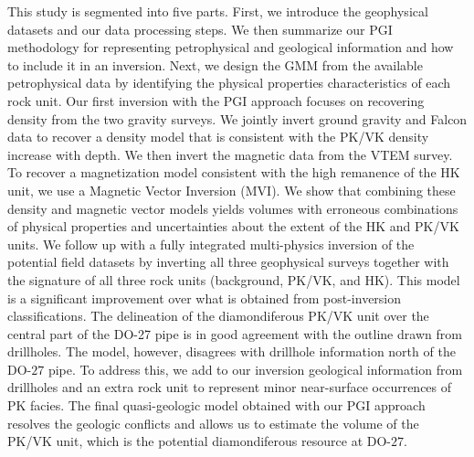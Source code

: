 \documentclass[paper, twocolumn]{geophysics} %
\begin{document}
This study is segmented into five parts. First, we introduce the geophysical datasets and our data processing steps. We then summarize our PGI methodology for representing petrophysical and geological information and how to include it in an inversion. Next, we design the GMM from the available petrophysical data by identifying the physical properties characteristics of each rock unit. Our first inversion with the PGI approach focuses on recovering density from the two gravity surveys. We jointly invert ground gravity and Falcon data to recover a density model that is consistent with the PK/VK density increase with depth. We then invert the magnetic data from the VTEM survey. To recover a magnetization model consistent with the high remanence of the HK unit, we use a Magnetic Vector Inversion (MVI). We show that combining these density and magnetic vector models yields volumes with erroneous combinations of physical properties and uncertainties about the extent of the HK and PK/VK units.
We follow up with a fully integrated multi-physics inversion of the potential field datasets by inverting all three geophysical surveys together with the signature of all three rock units (background, PK/VK, and HK). This model is a significant improvement over what is obtained from post-inversion classifications. The delineation of the diamondiferous PK/VK unit over the central part of the DO-27 pipe is in good agreement with the outline drawn from drillholes. The model, however, disagrees with drillhole information north of the DO-$27$ pipe. To address this, we add to our inversion geological information from drillholes and an extra rock unit to represent minor near-surface occurrences of PK facies. The final quasi-geologic model obtained with our PGI approach resolves the geologic conflicts and allows us to estimate the volume of the PK/VK unit, which is the potential diamondiferous resource at DO-$27$.


\end{document}
